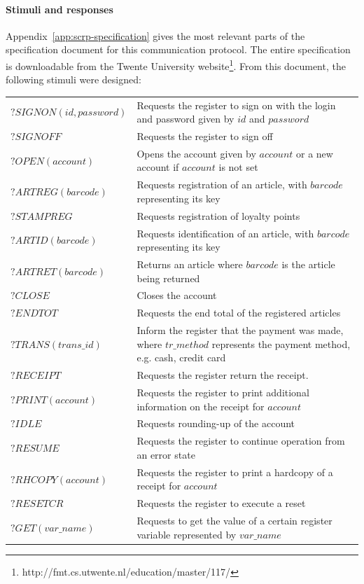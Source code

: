 \paragraph*{Stimuli and responses}
Appendix~\ref{app:scrp-specification} gives the most relevant parts of the specification document for this communication protocol. The entire specification is downloadable from the Twente University website\footnote{http://fmt.cs.utwente.nl/education/master/117/}. From this document, the following stimuli were designed:
\vspace{5px} \\
\begin{tabular}{lp{280px}} 
$\mathit{?SIGNON(id, password)}$ & Requests the register to sign on with the login and password given by $\mathit{id}$ and $\mathit{password}$\\
$\mathit{?SIGNOFF}$ & Requests the register to sign off\\
$\mathit{?OPEN(account)}$ & Opens the account given by $\mathit{account}$ or a new account if $\mathit{account}$ is not set\\
$\mathit{?ARTREG(barcode)}$ & Requests registration of an article, with $\mathit{barcode}$ representing its key \\
$\mathit{?STAMPREG}$ & Requests registration of loyalty points \\
$\mathit{?ARTID(barcode)}$ & Requests identification of an article, with $\mathit{barcode}$ representing its key\\
$\mathit{?ARTRET(barcode)}$ & Returns an article where $\mathit{barcode}$ is the article being returned \\
$\mathit{?CLOSE}$ & Closes the account\\
$\mathit{?ENDTOT}$ & Requests the end total of the registered articles\\
$\mathit{?TRANS(trans\_id)}$ & Inform the register that the payment was made, where $\mathit{tr\_method}$ represents the payment method, e.g. cash, credit card\\
$\mathit{?RECEIPT}$ & Requests the register return the receipt.\\
$\mathit{?PRINT(account)}$ & Requests the register to print additional information on the receipt for $\mathit{account}$\\
$\mathit{?IDLE}$ & Requests rounding-up of the account\\
$\mathit{?RESUME}$ & Requests the register to continue operation from an error state\\
$\mathit{?RHCOPY(account)}$ & Requests the register to print a hardcopy of a receipt for $\mathit{account}$\\
$\mathit{?RESETCR}$ & Requests the register to execute a reset \\
$\mathit{?GET(var\_name)}$ & Requests to get the value of a certain register variable represented by $\mathit{var\_name}$
\end{tabular}

